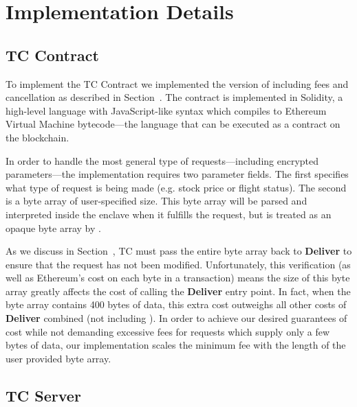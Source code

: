 \section{\tc Implementation Details}
\label{sec:impl}

\subsection{TC Contract}

To implement the TC Contract we implemented the version of \tcont including fees and cancellation as described in Section~.
The contract is implemented in Solidity, a high-level language with JavaScript-like syntax which compiles to Ethereum Virtual Machine bytecode---the language that can be executed as a contract on the blockchain.

In order to handle the most general type of requests---including encrypted parameters---the \tcont implementation requires two parameter fields.
The first specifies what type of request is being made (e.g. stock price or flight status).
The second is a byte array of user-specified size.
This byte array will be parsed and interpreted inside the enclave when it fulfills the request, but is treated as an opaque byte array by \tcont.

As we discuss in Section~, TC must pass the entire byte array back to {\bf Deliver} to ensure that the request has not been modified.
Unfortunately, this verification (as well as Ethereum's cost on each byte in a transaction) means the size of this byte array greatly affects the cost of calling the {\bf Deliver} entry point.
In fact, when the byte array contains 400 bytes of data, this extra cost outweighs all other costs of {\bf Deliver} combined (not including \dgcallback).
In order to achieve our desired guarantees of cost while not demanding excessive fees for requests which supply only a few bytes of data,
our implementation scales the minimum fee with the length of the user provided byte array.



\subsection{TC Server}


